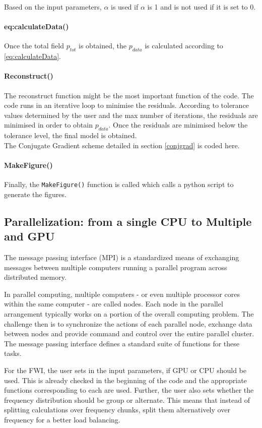 \documentclass[10pt,a4paper]{article}
\begin{document}
Based on the input parameters, $\alpha$ is used
if $\alpha$ is 1 and is not used if it is set
to 0.

\paragraph{eq:calculateData()}
Once the total field $p_{tot}$ is obtained, the $p_{data}$ is
calculated according to \ref{eq:calculateData}.

\paragraph{Reconstruct()}
The reconstruct function might be the most important function of the
code. The code runs in an iterative loop to minimise the residuals.
According to tolerance values determined by the user and the max
number of iterations, the residuals are minimised in order to obtain
$p_{data}$. Once the residuals are minimised below the tolerance
level, the final model is obtained.\\

The Conjugate Gradient scheme detailed in section \ref{conjgrad} is coded here.

\paragraph{MakeFigure()}

Finally, the \texttt{MakeFigure()} function is called which calls a
python script to generate the figures.

\subsection{Parallelization: from a single CPU to Multiple and GPU}
The message passing interface (MPI) is a standardized means of
exchanging messages between multiple computers running a parallel
program across distributed memory.

In parallel computing, multiple computers - or even multiple processor
cores within the same computer - are called nodes.  Each node in the
parallel arrangement typically works on a portion of the overall
computing problem. The challenge then is to synchronize the actions of
each parallel node, exchange data between nodes and provide command
and control over the entire parallel cluster. The message passing
interface defines a standard suite of functions for these tasks.

For the FWI, the user sets in the input parameters, if GPU or CPU
should be used. This is already checked in the beginning of the code
and the appropriate functions corresponding to each are used. Further,
the user also sets whether the frequency distribution should be group
or alternate. This means that instead of splitting calculations over
frequency chunks, split them alternatively over frequency for a better
load balancing.
\end{document}
